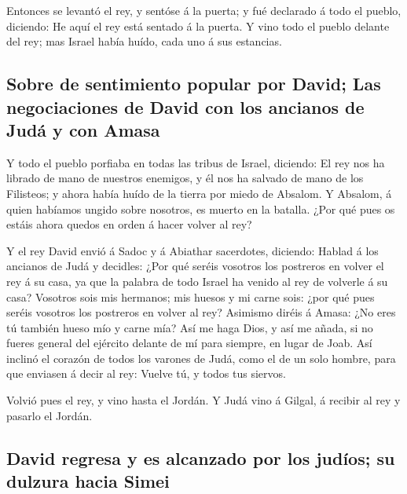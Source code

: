  Entonces se levantó el rey, y sentóse á la puerta; y fué
declarado á todo el pueblo, diciendo: He aquí el rey está sentado á la
puerta. Y vino todo el pueblo delante del rey; mas Israel había huído,
cada uno á sus estancias.

\hypertarget{sobre-de-sentimiento-popular-por-david-las-negociaciones-de-david-con-los-ancianos-de-juduxe1-y-con-amasa}{%
\subsection{Sobre de sentimiento popular por David; Las negociaciones de
David con los ancianos de Judá y con
Amasa}\label{sobre-de-sentimiento-popular-por-david-las-negociaciones-de-david-con-los-ancianos-de-juduxe1-y-con-amasa}}

 Y todo el pueblo porfiaba en todas las tribus de Israel,
diciendo: El rey nos ha librado de mano de nuestros enemigos, y él nos
ha salvado de mano de los Filisteos; y ahora había huído de la tierra
por miedo de Absalom.  Y Absalom, á quien habíamos ungido
sobre nosotros, es muerto en la batalla. ¿Por qué pues os estáis ahora
quedos en orden á hacer volver al rey?

 Y el rey David envió á Sadoc y á Abiathar sacerdotes,
diciendo: Hablad á los ancianos de Judá y decidles: ¿Por qué seréis
vosotros los postreros en volver el rey á su casa, ya que la palabra de
todo Israel ha venido al rey de volverle á su casa? 
Vosotros sois mis hermanos; mis huesos y mi carne sois: ¿por qué pues
seréis vosotros los postreros en volver al rey?  Asimismo
diréis á Amasa: ¿No eres tú también hueso mío y carne mía? Así me haga
Dios, y así me añada, si no fueres general del ejército delante de mí
para siempre, en lugar de Joab.  Así inclinó el corazón
de todos los varones de Judá, como el de un solo hombre, para que
enviasen á decir al rey: Vuelve tú, y todos tus siervos.

 Volvió pues el rey, y vino hasta el Jordán. Y Judá vino
á Gilgal, á recibir al rey y pasarlo el Jordán.

\hypertarget{david-regresa-y-es-alcanzado-por-los-juduxedos-su-dulzura-hacia-simei}{%
\subsection{David regresa y es alcanzado por los judíos; su dulzura
hacia
Simei}\label{david-regresa-y-es-alcanzado-por-los-juduxedos-su-dulzura-hacia-simei}}

